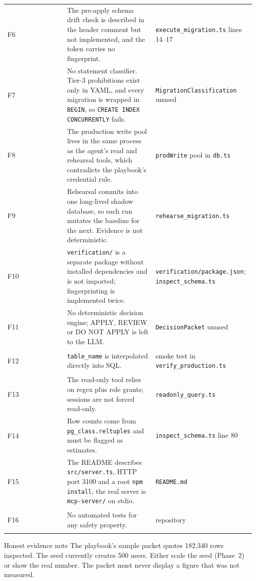 \documentclass[11pt,a4paper]{article}
\newcommand{\fp}[1]{\nolinkurl{#1}}  %
\newcommand{\sev}[2]{\colorbox{#1}{\textcolor{white}{\sffamily\scriptsize\bfseries\strut #2}}}
\newcommand{\crit}{\sev{sfred}{CRITICAL}}
\newcommand{\high}{\sev{sforange}{HIGH}}
\newcommand{\med}{\sev{sfamber}{MEDIUM}}
\newcommand{\low}{\sev{sfgrey}{LOW}}
\begin{document}
\begin{longtable}{@{}L{0.7cm}L{1.8cm}L{6.9cm}L{5.2cm}@{}}
F6 & \crit & The pre-apply schema drift check is described in the header comment but not
  implemented, and the token carries no fingerprint. & \fp{execute_migration.ts} lines 14--17 \\
F7 & \high & No statement classifier. Tier-3 prohibitions exist only in YAML, and every
  migration is wrapped in \texttt{BEGIN}, so \texttt{CREATE INDEX CONCURRENTLY} fails.
  & \fp{MigrationClassification} unused \\
F8 & \high & The production write pool lives in the same process as the agent's
  read and rehearsal tools, which contradicts the playbook's credential rule. & \fp{prodWrite} pool in \fp{db.ts} \\
F9 & \high & Rehearsal commits into one long-lived shadow database, so each run mutates the
  baseline for the next. Evidence is not deterministic. & \fp{rehearse_migration.ts} \\
F10 & \med & \fp{verification/} is a separate package without installed dependencies and is
  not imported; fingerprinting is implemented twice. & \fp{verification/package.json}; \fp{inspect_schema.ts} \\
F11 & \med & No deterministic decision engine; APPLY, REVIEW or DO NOT APPLY is left to the LLM. & \fp{DecisionPacket} unused \\
F12 & \med & \fp{table_name} is interpolated directly into SQL. & smoke test in \fp{verify_production.ts} \\
F13 & \med & The read-only tool relies on regex plus role grants; sessions are not forced read-only. & \fp{readonly_query.ts} \\
F14 & \low & Row counts come from \fp{pg_class.reltuples} and must be flagged as estimates. & \fp{inspect_schema.ts} line 80 \\
F15 & \low & The README describes \fp{src/server.ts}, HTTP port 3100 and a root \texttt{npm install};
  the real server is \fp{mcp-server/} on stdio. & \fp{README.md} \\
F16 & \med & No automated tests for any safety property. & repository \\
\bottomrule
\end{longtable}

\begin{warnbox}{Honest evidence note}
The playbook's sample packet quotes 182{,}340 rows inspected. The seed currently creates
500 users. Either scale the seed (Phase~2) or show the real number. The
packet must never display a figure that was not measured.
\end{warnbox}
\end{document}
